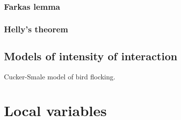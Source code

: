 \documentclass[11pt]{article}
\begin{document}
\subsubsection*{Farkas lemma}
\label{sec-15-5-1}
\subsubsection*{Helly's theorem}
\label{sec-15-5-2}
\subsection*{Models of intensity of interaction}
\label{sec-15-6}
Cucker-Smale model of bird flocking.

\section*{Local variables}
\label{sec-16}
\end{document}

